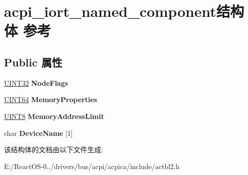 \hypertarget{structacpi__iort__named__component}{}\section{acpi\+\_\+iort\+\_\+named\+\_\+component结构体 参考}
\label{structacpi__iort__named__component}
\subsection*{Public 属性}
\begin{DoxyCompactItemize}
\item 
\mbox{\label{structacpi__iort__named__component_afbe5e54e76b51cbf3479c9299a201d01}} 
\hyperlink{_processor_bind_8h_ae1e6edbbc26d6fbc71a90190d0266018}{U\+I\+N\+T32} {\bfseries Node\+Flags}
\item 
\mbox{\label{structacpi__iort__named__component_a1bb9558b4b15668d2937e91c4edb887e}} 
\hyperlink{_processor_bind_8h_a57be03562867144161c1bfee95ca8f7c}{U\+I\+N\+T64} {\bfseries Memory\+Properties}
\item 
\mbox{\label{structacpi__iort__named__component_a4afb3d5136ede284d7eedd0ad03a02b6}} 
\hyperlink{_processor_bind_8h_ab27e9918b538ce9d8ca692479b375b6a}{U\+I\+N\+T8} {\bfseries Memory\+Address\+Limit}
\item 
\mbox{\label{structacpi__iort__named__component_a06f26bd22781928b5bcf18a7b280421a}} 
char {\bfseries Device\+Name} \mbox{[}1\mbox{]}
\end{DoxyCompactItemize}


该结构体的文档由以下文件生成\+:\begin{DoxyCompactItemize}
\item 
E\+:/\+React\+O\+S-\/0../drivers/bus/acpi/acpica/include/actbl2.\+h\end{DoxyCompactItemize}
